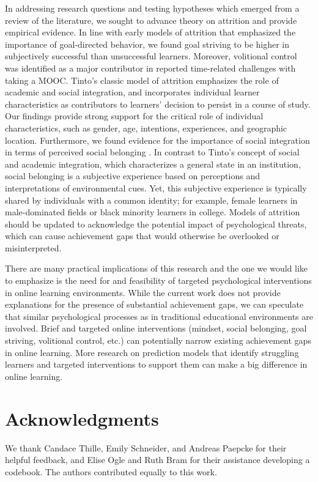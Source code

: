 \documentclass{sigchi}\usepackage[]{graphicx}\usepackage[]{color}
\begin{document}
In addressing research questions and testing hypotheses which emerged from a review of the literature, we sought to advance theory on attrition and provide empirical evidence. In line with early models of attrition that emphasized the importance of goal-directed behavior, we found goal striving to be higher in subjectively successful than unsuccessful learners. Moreover, volitional control was identified as a major contributor in reported time-related challenges with taking a MOOC. Tinto's \cite{tinto1975dropout} classic model of attrition emphasizes the role of academic and social integration, and incorporates individual learner characteristics as contributors to learners' decision to persist in a course of study. Our findings provide strong support for the critical role of individual characteristics, such as gender, age, intentions, experiences, and geographic location. Furthermore, we found evidence for the importance of social integration in terms of perceived social belonging \cite{walton2007question}. In contrast to Tinto's concept of social and academic integration, which characterizes a general state in an institution, social belonging is a subjective experience based on perceptions and interpretations of environmental cues. Yet, this subjective experience is typically shared by individuals with a common identity; for example,  female learners in male-dominated fields or black minority learners in college. Models of attrition should be updated to acknowledge the potential impact of psychological threats, which can cause achievement gaps that would otherwise be overlooked or misinterpreted. 

There are many practical implications of this research and the one we would like to emphasize is the need for and feasibility of targeted psychological interventions in online learning environments. While the current work does not provide explanations for the presence of substantial achievement gaps, we can speculate that similar psychological processes as in traditional educational environments are involved. Brief and targeted online interventions (mindset, social belonging, goal striving, volitional control, etc.) can potentially narrow existing achievement gaps in online learning. More research on prediction models that identify struggling learners and targeted interventions to support them can make a big difference in online learning.


\section{Acknowledgments}
We thank Candace Thille, Emily Schneider, and Andreas Paepcke for their helpful feedback, and Elise Ogle and Ruth Bram for their assistance developing a codebook. The authors contributed equally to this work.
\end{document}
